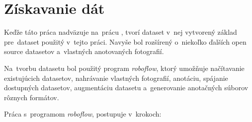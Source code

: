     \section{Získavanie dát}

        Keďže táto práca nadväzuje na~prácu \cite{Jurecka2021}, tvorí dataset v~nej vytvorený základ pre~dataset použitý v~tejto práci. Navyše bol rozšírený o~niekoľko ďalších open source datasetov a~vlastných anotovaných fotografií.

        Na~tvorbu datasetu bol použitý program \emph{roboflow}, ktorý umožňuje načítavanie existujúcich datasetov, nahrávanie vlastných fotografií, anotáciu, spájanie dostupných datasetov, augmentáciu datasetu a~generovanie anotačných súborov rôznych formátov.

        Práca s~programom \emph{roboflow}, postupuje v~krokoch:

